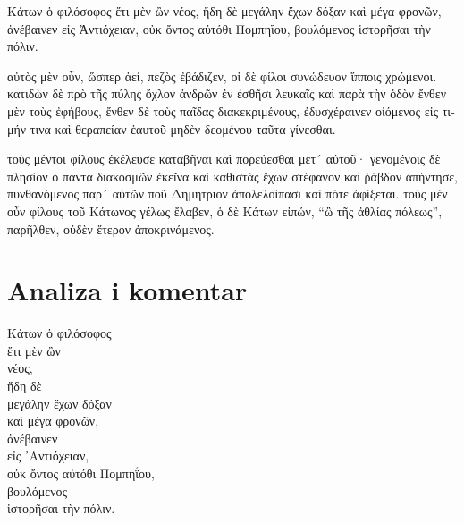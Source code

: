{\large

\begin{greek}

\noindent  Κάτων ὁ φιλόσοφος ἔτι μὲν ὢν νέος, ἤδη δὲ μεγάλην ἔχων δόξαν καὶ μέγα φρονῶν, ἀνέβαινεν εἰς Ἀντιόχειαν, οὐκ ὄντος αὐτόθι Πομπηΐου, βουλόμενος ἱστορῆσαι τὴν πόλιν.

\noindent αὐτὸς μὲν οὖν, ὥσπερ ἀεί, πεζὸς ἐβάδιζεν, οἱ δὲ φίλοι συνώδευον ἵπποις χρώμενοι. κατιδὼν δὲ πρὸ τῆς πύλης ὄχλον ἀνδρῶν ἐν ἐσθῆσι λευκαῖς καὶ παρὰ τὴν ὁδὸν ἔνθεν μὲν τοὺς ἐφήβους, ἔνθεν δὲ τοὺς παῖδας διακεκριμένους, ἐδυσχέραινεν οἰόμενος εἰς τιμήν τινα καὶ θεραπείαν ἑαυτοῦ μηδὲν δεομένου ταῦτα γίνεσθαι.

\noindent τοὺς μέντοι φίλους ἐκέλευσε καταβῆναι καὶ πορεύεσθαι μετ´ αὐτοῦ· γενομένοις δὲ πλησίον ὁ πάντα διακοσμῶν ἐκεῖνα καὶ καθιστὰς ἔχων στέφανον καὶ ῥάβδον ἀπήντησε, πυνθανόμενος παρ´ αὐτῶν ποῦ Δημήτριον ἀπολελοίπασι καὶ πότε ἀφίξεται. τοὺς μὲν οὖν φίλους τοῦ Κάτωνος γέλως ἔλαβεν, ὁ δὲ Κάτων εἰπών, ``ὢ τῆς ἀθλίας πόλεως'', παρῆλθεν, οὐδὲν ἕτερον ἀποκρινάμενος.

\end{greek}

}

\newpage

\section*{Analiza i komentar}


{\large
\begin{greek}
\noindent Κάτων ὁ φιλόσοφος \\
\tabto{2em} ἔτι μὲν ὢν \\
\tabto{4em} νέος, \\
\tabto{2em} ἤδη δὲ \\
\tabto{4em} μεγάλην ἔχων δόξαν \\
\tabto{2em} καὶ μέγα φρονῶν, \\
ἀνέβαινεν \\
\tabto{2em} εἰς ᾿Αντιόχειαν, \\
οὐκ ὄντος αὐτόθι Πομπηΐου, \\
βουλόμενος \\
\tabto{2em} ἱστορῆσαι τὴν πόλιν. \\

\end{greek}
}

